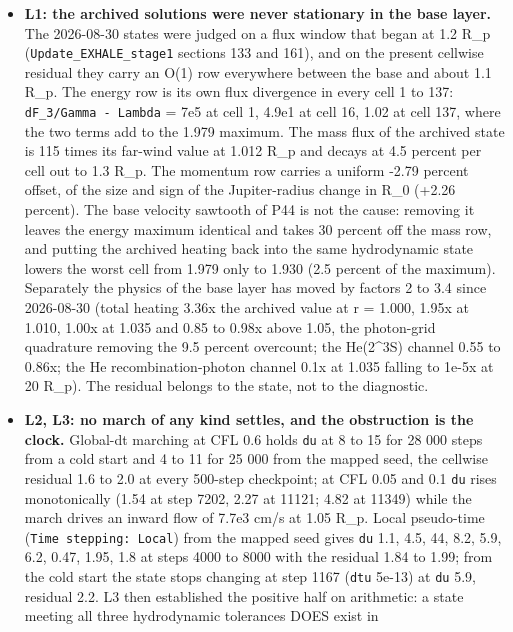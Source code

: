 \documentclass[english,a4paper]{my_memo}
\begin{document}
\begin{itemize}
\item
  \textbf{L1: the archived solutions were never stationary in the base layer.}
  The 2026-08-30 states were judged on a flux window that began at 1.2 R\_p
  (\texttt{Update\_EXHALE\_stage1} sections 133 and 161), and on the present cellwise residual
  they carry an O(1) row everywhere between the base and about 1.1 R\_p. The
  energy row is its own flux divergence in every cell 1 to 137:
  \texttt{\textbar{}dF\_3\textbar{}/\textbar{}Gamma\ -\ Lambda\textbar{}} = 7e5 at cell 1, 4.9e1 at cell 16, 1.02 at cell
  137, where the two terms add to the 1.979 maximum. The mass flux of the
  archived state is 115 times its far-wind value at 1.012 R\_p and decays at
  4.5 percent per cell out to 1.3 R\_p. The momentum row carries a uniform
  -2.79 percent offset, of the size and sign of the Jupiter-radius change in
  R\_0 (+2.26 percent). The base velocity sawtooth of P44 is not the cause:
  removing it leaves the energy maximum identical and takes 30 percent off
  the mass row, and putting the archived heating back into the same
  hydrodynamic state lowers the worst cell from 1.979 only to 1.930 (2.5
  percent of the maximum). Separately the physics of the base layer has
  moved by factors 2 to 3.4 since 2026-08-30 (total heating 3.36x the
  archived value at r = 1.000, 1.95x at 1.010, 1.00x at 1.035 and 0.85 to
  0.98x above 1.05, the photon-grid quadrature removing the 9.5 percent
  overcount; the He(2\^{}3S) channel 0.55 to 0.86x; the He
  recombination-photon channel 0.1x at 1.035 falling to 1e-5x at 20 R\_p).
  The residual belongs to the state, not to the diagnostic.
\item
  \textbf{L2, L3: no march of any kind settles, and the obstruction is the clock.}
  Global-dt marching at CFL 0.6 holds \texttt{du} at 8 to 15 for 28 000 steps from a
  cold start and 4 to 11 for 25 000 from the mapped seed, the cellwise
  residual 1.6 to 2.0 at every 500-step checkpoint; at CFL 0.05 and 0.1 \texttt{du}
  rises monotonically (1.54 at step 7202, 2.27 at 11121; 4.82 at 11349) while
  the march drives an inward flow of 7.7e3 cm/s at 1.05 R\_p. Local pseudo-time
  (\texttt{Time\ stepping:\ Local}) from the mapped seed gives \texttt{du} 1.1, 4.5, 44, 8.2,
  5.9, 6.2, 0.47, 1.95, 1.8 at steps 4000 to 8000 with the residual 1.84 to
  1.99; from the cold start the state stops changing at step 1167 (\texttt{dtu}
  5e-13) at \texttt{du} 5.9, residual 2.2. L3 then established the positive half on
  arithmetic: a state meeting all three hydrodynamic tolerances DOES exist in

\end{itemize}
\end{document}
